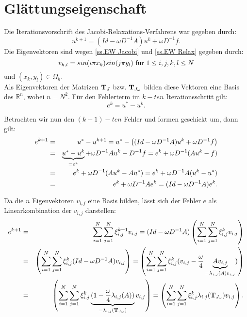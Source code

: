 \section{Glättungseigenschaft}\label{s.Glättungseigenschaft}

Die Iterationsvorschrift des Jacobi-Relaxations-Verfahrens war gegeben durch:
\begin{equation}
u^{k+1} = (Id - \omega D^{-1}A)u^{k} + \omega D^{-1}f.
\end{equation}
Die Eigenvektoren sind wegen \autoref{ss.EW Jacobi} und \autoref{ss.EW Relax} gegeben durch:
\begin{equation}
v_{k,l} = sin(i \pi x_{k})sin(j \pi y_{l}) \textnormal{ für } 1 \le i,j,k,l \le N
\end{equation}
und $(x_{k}, y_{l}) \in \Omega_{h}$. \\
Als Eigenvektoren der Matrizen ${\textbf{T}}_{J}$ bzw. ${\textbf{T}}_{J_{\omega}}$ bilden diese Vektoren eine Basis des $\mathbb{R}^{n}$, wobei $n = N^{2}$.
Für den Fehlerterm im $k-ten$ Iterationsschritt gilt:
\begin{equation}
e^{k} = u^{*} - u^{k}.
\end{equation}

Betrachten wir nun den $(k+1)-ten$ Fehler und formen geschickt um, dann gilt:
\begin{eqnarray}
e^{k+1} &=& u^{*} - u^{k+1} = u^{*} - \left( (Id - \omega D^{-1} A)u^{k} + \omega D^{-1}f \right) \notag \\
&=& \underbrace{u^{*} - u^{k}}_{= e^{k}} + \omega D^{-1} A u^{k} - D^{-1}f = e^{k} + \omega D^{-1} (Au^{k} - f) \notag \\
&=& e^{k} + \omega D^{-1} (Au^{k} - Au^{*}) = e^{k} + \omega D^{-1} A(u^{k} - u^{*}) \notag \\
&=& e^{k} + \omega D^{-1} A e^{k} = (Id - \omega D^{-1} A) e^{k}.
\end{eqnarray}

\label{img.Jacobi1}

Da die $n$ Eigenvektoren $v_{i,j}$ eine Basis bilden, lässt sich der Fehler $e$ als Linearkombination der $v_{i,j}$ darstellen:
\begin{eqnarray}
e^{k+1} &=& \sum_{i = 1}^{N} \sum_{j = 1}^{N} \xi^{k+1}_{i,j} v_{i,j} = (Id - \omega D^{-1}A) \left(\sum_{i = 1}^{N} \sum_{j = 1}^{N} \xi^{k}_{i,j} v_{i,j}\right) \notag \\
&=& \left(\sum_{i = 1}^{N} \sum_{j = 1}^{N} \xi^{k}_{i,j} (Id - \omega D^{-1}A) v_{i,j}\right) = \left(\sum_{i = 1}^{N} \sum_{j = 1}^{N} \xi^{k}_{i,j} (v_{i,j} - \frac {\omega} {4} \underbrace{A v_{i,j}}_{= \lambda_{i,j}(A)v_{i,j}})\right) \notag \\
&=& \left(\sum_{i = 1}^{N} \sum_{j = 1}^{N} \xi^{k}_{i,j} \underbrace{(1 - \frac {\omega} {4} \lambda_{i,j}(A))}_{= \lambda_{i,j}({\textbf{T}}_{J_{\omega}})} v_{i,j}\right) = \left(\sum_{i = 1}^{N} \sum_{j = 1}^{N} \xi^{k}_{i,j} \lambda_{i,j}({\textbf{T}}_{J_{\omega}}) v_{i,j}\right).
\end{eqnarray}

